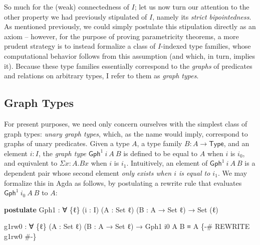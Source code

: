 \documentclass[
  12pt]{article}
\newenvironment{Shaded}{\begin{snugshade}}{\end{snugshade}}
\newcommand{\DataTypeTok}[1]{\textcolor[rgb]{0.00,0.34,0.68}{#1}}
\newcommand{\KeywordTok}[1]{\textcolor[rgb]{0.12,0.11,0.11}{\textbf{#1}}}
\newcommand{\NormalTok}[1]{\textcolor[rgb]{0.12,0.11,0.11}{#1}}
\newcommand{\OtherTok}[1]{\textcolor[rgb]{0.00,0.43,0.16}{#1}}
\newcommand{\PreprocessorTok}[1]{\textcolor[rgb]{0.00,0.43,0.16}{#1}}
\begin{document}
So much for the (weak) connectedness of \(I\); let us now turn our
attention to the other property we had previously stipulated of \(I\),
namely its \emph{strict bipointedness}. As mentioned previously, we
could simply postulate this stipulation directly as an axiom -- however,
for the purpose of proving parametricity theorems, a more prudent
strategy is to instead formalize a class of \(I\)-indexed type families,
whose computational behavior follows from this assumption (and which, in
turn, implies it). Because these type families essentially correspond to
the \emph{graphs} of predicates and relations on arbitrary types, I
refer to them as \emph{graph types}.

\subsection{Graph Types}\label{graph-types}

For present purposes, we need only concern ourselves with the simplest
class of graph types: \emph{unary graph types}, which, as the name would
imply, correspond to graphs of unary predicates. Given a type \(A\), a
type family \(B : A \to \mathsf{Type}\), and an element \(i : I\), the
\emph{graph type} \(\mathsf{Gph}^1 ~ i ~ A ~ B\) is defined to be equal
to \(A\) when \(i\) is \(i_0\), and equivalent to \(\Sigma x : A . B x\)
when \(i\) is \(i_1\). Intuitively, an element of
\(\mathsf{Gph}^1 ~ i ~ A ~ B\) is a dependent pair whose second element
\emph{only exists when \(i\) is equal to \(i_1\)}. We may formalize this
in Agda as follows, by postulating a rewrite rule that evaluates
\(\mathsf{Gph}^1 ~ i_0 ~ A ~ B\) to \(A\):

\begin{Shaded}
\begin{Highlighting}[]
\KeywordTok{postulate}
\NormalTok{    Gph1 }\OtherTok{:} \OtherTok{∀} \OtherTok{\{}\NormalTok{ℓ}\OtherTok{\}} \OtherTok{(}\NormalTok{i }\OtherTok{:}\NormalTok{ I}\OtherTok{)} \OtherTok{(}\NormalTok{A }\OtherTok{:} \DataTypeTok{Set}\NormalTok{ ℓ}\OtherTok{)} \OtherTok{(}\NormalTok{B }\OtherTok{:}\NormalTok{ A }\OtherTok{→} \DataTypeTok{Set}\NormalTok{ ℓ}\OtherTok{)} \OtherTok{→} \DataTypeTok{Set} \OtherTok{(}\NormalTok{ℓ}\OtherTok{)}

\NormalTok{    g1rw0 }\OtherTok{:} \OtherTok{∀} \OtherTok{\{}\NormalTok{ℓ}\OtherTok{\}} \OtherTok{(}\NormalTok{A }\OtherTok{:} \DataTypeTok{Set}\NormalTok{ ℓ}\OtherTok{)} \OtherTok{(}\NormalTok{B }\OtherTok{:}\NormalTok{ A }\OtherTok{→} \DataTypeTok{Set}\NormalTok{ ℓ}\OtherTok{)} \OtherTok{→}\NormalTok{ Gph1 i0 A B ≡ A}
    \PreprocessorTok{\{{-}\# REWRITE g1rw0 \#{-}\}}
\end{Highlighting}
\end{Shaded}
\end{document}
